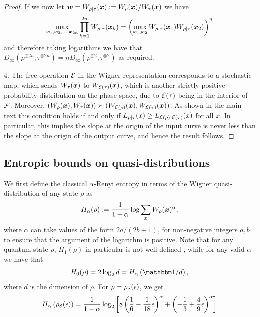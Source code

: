 \documentclass[pra,
aps,
twocolumn,
superscriptaddress,
groupedaddress,
nofootinbib,
reprint
]{revtex4-1}
\begin{document}
\begin{proof}
If we now let $\boldsymbol{w} = W_{\rho|\tau}(\boldsymbol{x}) := W_{\rho}(\boldsymbol{x}) /W_{\tau}(\boldsymbol{x})$ we have
\begin{equation}
\max_{\boldsymbol{x}_1, \boldsymbol{x}_2, \dots ,\boldsymbol{x}_{2n}} \prod_{k=1}^{2n} W_{\rho|\tau}(\boldsymbol{x}_k) = \left( \max_{\boldsymbol{x}_1, \boldsymbol{x}_2} W_{\rho|\tau}(\boldsymbol{x}_1)W_{\rho|\tau}(\boldsymbol{x}_2) \right)^n
\end{equation}
and therefore taking logarithms we have that $D_\infty (\rho^{\otimes 2n}, \tau^{\otimes 2n}) = n D_\infty(\rho^{\otimes 2} ,\tau^{\otimes 2})$ as required.

4. The free operation ${\mathcal E}$ in the Wigner representation corresponds to a stochastic map, which sends $W_\tau(\boldsymbol{x})$ to $W_{{\mathcal E}(\tau)}(\boldsymbol{x})$, which is another strictly positive probability distribution on the phase space, due to ${\mathcal E}(\tau)$ being in the interior of ${\mathcal F}$. Moreover, $(W_\rho(\boldsymbol{x}), W_\tau(\boldsymbol{x}) ) \succ (W_{{\mathcal E}(\rho)}(\boldsymbol{x}) , W_{{\mathcal E}(\tau)}(\boldsymbol{x}))$. As shown in the main text this condition holds if and only if $L_{\rho|\tau}(x) \ge L_{{\mathcal E}(\rho)|{\mathcal E}(\tau)}(x)$ for all $x$. In particular, this implies the slope at the origin of the input curve is never less than the slope at the origin of the output curve, and hence the result follows.
\end{proof}

\newpage

\subsection{Entropic bounds on quasi-distributions}

We first define the classical $\alpha$-Renyi entropy in terms of the Wigner quasi-distribution of any state $\rho$ as
\begin{equation}
	H_\alpha(\rho) := \frac{1}{1-\alpha} \log \sum_{\bm{x}} W_{\rho}(\bm{x})^\alpha,
\end{equation}
where $\alpha$ can take values of the form $2a / (2b+1)$, for non-negative integers $a,b$ to ensure that the argument of the logarithm is positive.
Note that for any quantum state $\rho$, $H_1(\rho)$ in particular is not well-defined  , while for any valid $\alpha$ we have that
\begin{equation}
	H_0(\rho) = 2\log_2 d = H_\alpha \left( \id/d \right),
\end{equation}
where $d$ is the dimension of $\rho$.
For $\rho = \rho_{\rm{S}}(\epsilon)$, we get
\begin{equation}
	H_{\alpha}\left(\rho_{\rm{S}}(\epsilon)\right) = \frac{1}{1-\alpha}\log_2 \left[ 8\left( \frac{1}{6} - \frac{1}{18}\epsilon \right)^\alpha + \left(-\frac{1}{3} + \frac{4}{9}\epsilon \right)^\alpha \right]
\end{equation}
\end{document}
